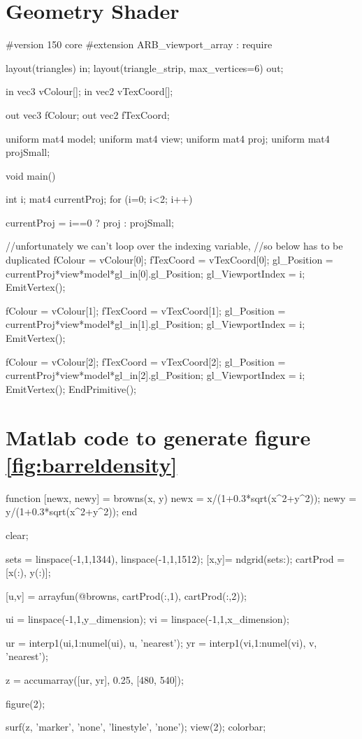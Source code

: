 \documentclass[12pt,a4paper,twoside,openright]{report}
\begin{document}
\chapter{Geometry Shader}
\begin{blockcode}
#version 150 core
#extension ARB_viewport_array : require

layout(triangles) in;
layout(triangle_strip, max_vertices=6) out;

in vec3 vColour[];
in vec2 vTexCoord[];

out vec3 fColour;
out vec2 fTexCoord;

uniform mat4 model;
uniform mat4 view;
uniform mat4 proj;
uniform mat4 projSmall;

void main()
{
	int i;
	mat4 currentProj;	
	for (i=0; i<2; i++){
		currentProj = i==0 ? proj : projSmall; 

		//unfortunately we can't loop over the indexing variable, 
		//so below has to be duplicated
		fColour = vColour[0];
		fTexCoord = vTexCoord[0];
		gl_Position = currentProj*view*model*gl_in[0].gl_Position;
		gl_ViewportIndex = i;
		EmitVertex();

		fColour = vColour[1];
		fTexCoord = vTexCoord[1];
		gl_Position = currentProj*view*model*gl_in[1].gl_Position;
		gl_ViewportIndex = i;
		EmitVertex();

		fColour = vColour[2];
		fTexCoord = vTexCoord[2];
		gl_Position = currentProj*view*model*gl_in[2].gl_Position;
		gl_ViewportIndex = i;
		EmitVertex();
		EndPrimitive();
	}
}
\end{blockcode}

\chapter{Matlab code to generate figure \ref{fig:barreldensity}}
\begin{blockcode}
function [newx, newy] = browns(x, y)
    newx = x/(1+0.3*sqrt(x^2+y^2));
    newy = y/(1+0.3*sqrt(x^2+y^2));
end

clear;

sets = {linspace(-1,1,1344), linspace(-1,1,1512)};
[x,y]= ndgrid(sets{:});
cartProd = [x(:), y(:)];

[u,v] = arrayfun(@browns, cartProd(:,1), cartProd(:,2)); 

ui = linspace(-1,1,y_dimension);
vi = linspace(-1,1,x_dimension);

ur = interp1(ui,1:numel(ui), u, 'nearest');
yr = interp1(vi,1:numel(vi), v, 'nearest');


z = accumarray([ur, yr], 0.25, [480, 540]);

figure(2);

surf(z, 'marker', 'none', 'linestyle', 'none');
view(2);
colorbar;
\end{blockcode}
\end{document}
